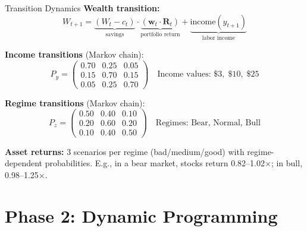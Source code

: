 \documentclass[aspectratio=169, 11pt]{beamer}
\begin{document}
\begin{frame}{Transition Dynamics}
\textbf{Wealth transition:}
\[
W_{t+1} = \underbrace{(W_t - c_t)}_{\text{savings}} \cdot \underbrace{(\mathbf{w}_t \cdot \mathbf{R}_t)}_{\text{portfolio return}} + \underbrace{\text{income}(y_{t+1})}_{\text{labor income}}
\]

\vspace{0.2em}
\textbf{Income transitions} (Markov chain):
\[
P_y = \begin{pmatrix} 0.70 & 0.25 & 0.05 \\ 0.15 & 0.70 & 0.15 \\ 0.05 & 0.25 & 0.70 \end{pmatrix}
\quad
\text{Income values: } \$3,\; \$10,\; \$25
\]

\vspace{0.2em}
\textbf{Regime transitions} (Markov chain):
\[
P_z = \begin{pmatrix} 0.50 & 0.40 & 0.10 \\ 0.20 & 0.60 & 0.20 \\ 0.10 & 0.40 & 0.50 \end{pmatrix}
\quad
\text{Regimes: Bear, Normal, Bull}
\]

\vspace{0.2em}
\textbf{Asset returns:} 3 scenarios per regime (bad/medium/good) with regime-dependent probabilities. E.g., in a bear market, stocks return 0.82--1.02$\times$; in bull, 0.98--1.25$\times$.
\end{frame}
\section{Phase 2: Dynamic Programming}
\end{document}
